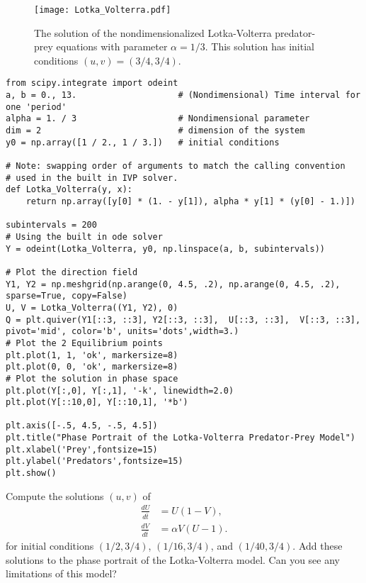 \begin{figure}[ht]
\centering
\texttt{[image: Lotka\_Volterra.pdf]}
\caption{The solution of the nondimensionalized Lotka-Volterra predator-prey equations with parameter $\alpha = 1/3$. 
This solution has initial conditions $(u,v) = (3/4, 3/4)$.}
\label{fig:pred-prey_Lotka_Voterra}
\end{figure}

\begin{lstlisting}
from scipy.integrate import odeint
a, b = 0., 13.                    # (Nondimensional) Time interval for one 'period'
alpha = 1. / 3                    # Nondimensional parameter
dim = 2                           # dimension of the system
y0 = np.array([1 / 2., 1 / 3.])   # initial conditions

# Note: swapping order of arguments to match the calling convention
# used in the built in IVP solver.
def Lotka_Volterra(y, x):
    return np.array([y[0] * (1. - y[1]), alpha * y[1] * (y[0] - 1.)])

subintervals = 200
# Using the built in ode solver
Y = odeint(Lotka_Volterra, y0, np.linspace(a, b, subintervals))

# Plot the direction field
Y1, Y2 = np.meshgrid(np.arange(0, 4.5, .2), np.arange(0, 4.5, .2), sparse=True, copy=False)
U, V = Lotka_Volterra((Y1, Y2), 0)
Q = plt.quiver(Y1[::3, ::3], Y2[::3, ::3],  U[::3, ::3],  V[::3, ::3], pivot='mid', color='b', units='dots',width=3.)
# Plot the 2 Equilibrium points
plt.plot(1, 1, 'ok', markersize=8)
plt.plot(0, 0, 'ok', markersize=8)
# Plot the solution in phase space
plt.plot(Y[:,0], Y[:,1], '-k', linewidth=2.0)
plt.plot(Y[::10,0], Y[::10,1], '*b')

plt.axis([-.5, 4.5, -.5, 4.5])
plt.title("Phase Portrait of the Lotka-Volterra Predator-Prey Model")
plt.xlabel('Prey',fontsize=15)
plt.ylabel('Predators',fontsize=15)
plt.show()
\end{lstlisting}

\begin{problem}
Compute the solutions $(u,v)$ of 
\begin{align*}
	\frac{dU}{d\bar{t}} &= U(1-V),\\
	\frac{dV}{d\bar{t}} &= \alpha V (U-1).
\end{align*}
for initial conditions $(1/2, 3/4)$, $(1/16, 3/4)$, and $(1/40, 3/4)$.
Add these solutions to the phase portrait of the Lotka-Volterra model.
Can you see any limitations of this model? 
\end{problem}

